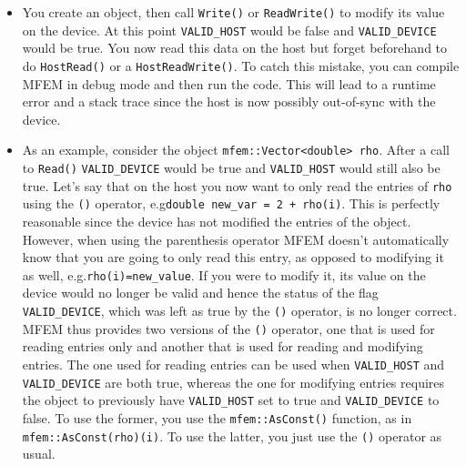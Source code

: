\documentclass[a4paper,11pt]{article}
\begin{document}
\begin{itemize}
    \item You create an object, then call \texttt{Write()} or \texttt{ReadWrite()} to modify its value on the device. At this point \texttt{VALID\_HOST} would be false and \texttt{VALID\_DEVICE} would be true. You now read this data on the host but forget beforehand to do \texttt{HostRead()} or a \texttt{HostReadWrite()}. To catch this mistake, you can compile MFEM in debug mode and then run the code. This will lead to a runtime error and a stack trace since the host is now possibly out-of-sync with the device. 
    
    \item As an example, consider the object \texttt{mfem::Vector<double> rho}. After a call to \texttt{Read()} \texttt{VALID\_DEVICE} would be true and \texttt{VALID\_HOST} would still also be true. Let's say that on the host you now want to only read the entries of \texttt{rho} using the \texttt{()} operator, e.g\@ \texttt{double new\_var = 2 + rho(i)}. This is perfectly reasonable since the device has not modified the entries of the object. However, when using the parenthesis operator MFEM doesn't automatically know that you are going to only read this entry, as opposed to modifying it as well, e.g.\@ \texttt{rho(i)=new\_value}. If you were to modify it, its value on the device would no longer be valid and hence the status of the flag \texttt{VALID\_DEVICE}, which was left as true by the \texttt{()} operator, is no longer correct. MFEM thus provides two versions of the \texttt{()} operator, one that is used for reading entries only and another that is used for reading and modifying entries. The one used for reading entries can be used when \texttt{VALID\_HOST} and \texttt{VALID\_DEVICE} are both true, whereas the one for modifying entries requires the object to previously have \texttt{VALID\_HOST} set to true and \texttt{VALID\_DEVICE} to false. To use the former, you use the \texttt{mfem::AsConst()} function, as in \texttt{mfem::AsConst(rho)(i)}. To use the latter, you just use the \texttt{()} operator as usual.
\end{itemize}    

\end{document}

